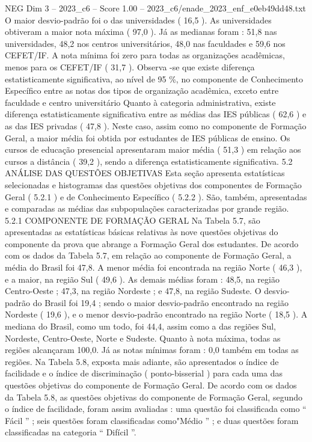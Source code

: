 \begin{textsample}{NEG Dim 3 – 2023\_c6 – Score 1.00 – 2023\_c6/enade\_2023\_enf\_e0eb49dd48.txt}
O maior desvio-padrão foi o das universidades ( 16,5 ).
As universidades obtiveram a maior nota máxima ( 97,0 ).
Já as medianas foram : 51,8 nas universidades, 48,2 nos centros universitários, 48,0 nas faculdades e 59,6 nos CEFET/IF.
A nota mínima foi zero para todas as organizações acadêmicas, menos para os CEFET/IF ( 31,7 ).
Observa -se que existe diferença estatisticamente significativa, ao nível de 95 \%, no componente de Conhecimento Específico entre as notas dos tipos de organização acadêmica, exceto entre faculdade e centro universitário Quanto à categoria administrativa, existe diferença estatisticamente significativa entre as médias das IES públicas ( 62,6 ) e as das IES privadas ( 47,8 ).
Neste caso, assim como no componente de Formação Geral, a maior média foi obtida por estudantes de IES públicas de ensino.
Os cursos de educação presencial apresentaram maior média ( 51,3 ) em relação aos cursos a distância ( 39,2 ), sendo a diferença estatisticamente significativa. 5.2 ANÁLISE DAS QUESTÕES OBJETIVAS Esta seção apresenta estatísticas selecionadas e histogramas das questões objetivas dos componentes de Formação Geral ( 5.2.1 ) e de Conhecimento Específico ( 5.2.2 ).
São, também, apresentadas e comparadas as médias das subpopulações caracterizadas por grande região. 5.2.1 COMPONENTE DE FORMAÇÃO GERAL Na Tabela 5.7, são apresentadas as estatísticas básicas relativas às nove questões objetivas do componente da prova que abrange a Formação Geral dos estudantes.
De acordo com os dados da Tabela 5.7, em relação ao componente de Formação Geral, a média do Brasil foi 47,8.
A menor média foi encontrada na região Norte ( 46,3 ), e a maior, na região Sul ( 49,6 ).
As demais médias foram : 48,5, na região Centro-Oeste ; 47,3, na região Nordeste ; e 47,8, na região Sudeste.
O desvio-padrão do Brasil foi 19,4 ; sendo o maior desvio-padrão encontrado na região Nordeste ( 19,6 ), e o menor desvio-padrão encontrado na região Norte ( 18,5 ).
A mediana do Brasil, como um todo, foi 44,4, assim como a das regiões Sul, Nordeste, Centro-Oeste, Norte e Sudeste.
Quanto à nota máxima, todas as regiões alcançaram 100,0.
Já as notas mínimas foram : 0,0 também em todas as regiões.
Na Tabela 5.8, exposta mais adiante, são apresentados o índice de facilidade e o índice de discriminação ( ponto-bisserial ) para cada uma das questões objetivas do componente de Formação Geral.
De acordo com os dados da Tabela 5.8, as questões objetivas do componente de Formação Geral, segundo o índice de facilidade, foram assim avaliadas : uma questão foi classificada como “ Fácil ” ; seis questões foram classificadas como"Médio ” ; e duas questões foram classificadas na categoria “ Difícil ”.

\end{textsample}
